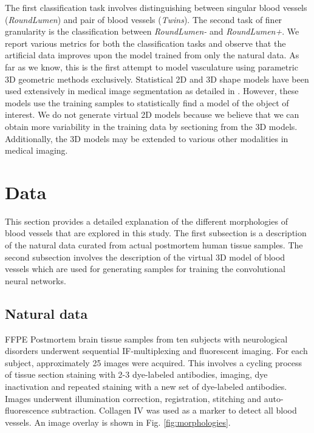 The first classification task involves distinguishing between singular blood vessels (\textit{RoundLumen}) and pair of blood vessels (\textit{Twins}). The second task of finer granularity is the classification between \textit{RoundLumen-} and \textit{RoundLumen+}. We report various metrics for both the classification tasks and observe that the artificial data improves upon the model trained from only the natural data.
As far as we know, this is the first attempt to model vasculature using parametric 3D geometric methods exclusively. Statistical 2D and 3D shape models have been used extensively in medical image segmentation as detailed in \cite{heimann2009statistical}. However, these models use the training samples to statistically find a model of the object of interest. We do not generate virtual 2D models because we believe that we can obtain more variability in the training data by sectioning from the 3D models. Additionally, the 3D models may be extended to various other modalities in medical imaging. 

\section{Data}

This section provides a detailed explanation of the different morphologies of blood vessels that are explored in this study. The first subsection is a description of the natural data curated from actual postmortem human tissue samples. The second subsection involves the description of the virtual 3D model of blood vessels which are used for generating samples for training the convolutional neural networks.

\subsection{Natural data}
FFPE Postmortem brain tissue samples from ten subjects with neurological disorders underwent sequential IF-multiplexing and fluorescent imaging. For each subject, approximately 25 images were acquired.   This involves a cycling process of tissue section staining with 2-3 dye-labeled antibodies, imaging, dye inactivation and repeated staining with a new set of dye-labeled antibodies. Images underwent illumination correction, registration, stitching and auto-fluorescence subtraction. Collagen IV was used as a marker to detect all blood vessels. An image overlay is shown in Fig. \ref{fig:morphologies}.

